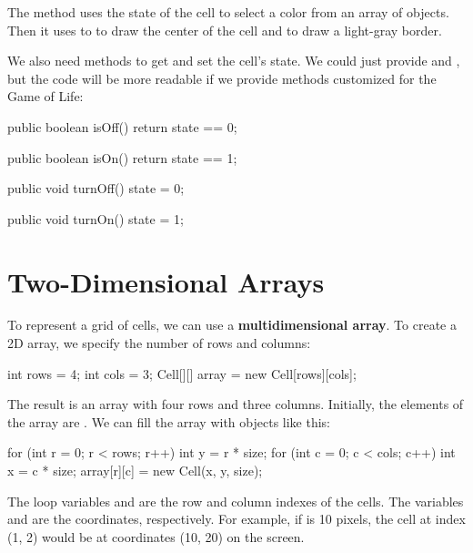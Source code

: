 The  method uses the state of the cell to select a color from an array of  objects.
Then it uses to  to draw the center of the cell and  to draw a light-gray border.

We also need methods to get and set the cell's state.
We could just provide  and , but the code will be more readable if we provide methods customized for the Game of Life:

\begin{code}
public boolean isOff() {
    return state == 0;
}

public boolean isOn() {
    return state == 1;
}

public void turnOff() {
    state = 0;
}

public void turnOn() {
    state = 1;
}
\end{code}



\section{Two-Dimensional Arrays}


To represent a grid of cells, we can use a {\bf multidimensional array}.
To create a 2D array, we specify the number of rows and columns:

\begin{code}
int rows = 4;
int cols = 3;
Cell[][] array = new Cell[rows][cols];
\end{code}

The result is an array with four rows and three columns.
Initially, the elements of the array are .
We can fill the array with  objects like this:

\begin{code}
for (int r = 0; r < rows; r++) {
    int y = r * size;
    for (int c = 0; c < cols; c++) {
        int x = c * size;
        array[r][c] = new Cell(x, y, size);
    }
}
\end{code}

The loop variables  and  are the row and column indexes of the cells.
The variables  and  are the coordinates, respectively.
For example, if  is 10 pixels, the cell at index (1, 2) would be at coordinates (10, 20) on the screen.

